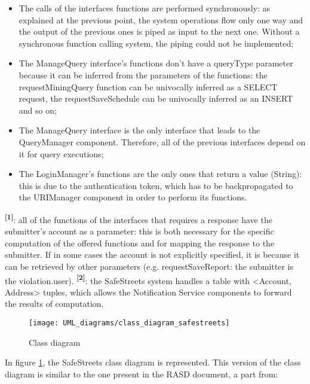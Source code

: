 \begin{itemize}
    \item The calls of the interfaces functions are performed synchronously: as explained at the previous point, the system operations flow only one way and the output of the previous ones is piped as input to the next one. Without a synchronous function calling system, the piping could not be implemented;
    \item The ManageQuery interface's functions don't have a queryType parameter because it can be inferred from the parameters of the functions: the requestMiningQuery function can be univocally inferred as a SELECT request, the requestSaveSchedule can be univocally inferred as an INSERT and so on;
    \item The ManageQuery interface is the only interface that leads to the QueryManager component. Therefore, all of the previous interfaces depend on it for query executions;
    \item The LoginManager's functions are the only ones that return a value (String): this is due to the authentication token, which has to be backpropagated to the URIManager component in order to perform its functions.
\end{itemize}
\textbf{\textsuperscript{[1]}}: all of the functions of the interfaces that requires a response have the submitter's account as a parameter: this is both necessary for the specific computation of the offered functions and for mapping the response to the submitter. If in some cases the account is not explicitly specified, it is because it can be retrieved by other parameters (e.g. requestSaveReport: the submitter is the violation.user).\newline
\textbf{\textsuperscript{[2]}}: the SafeStreets system handles a table with <Account, Address> tuples, which allows the Notification Service components to forward the results of computation.
\begin{figure}[H]
    \centering
    \texttt{[image: UML\_diagrams/class\_diagram\_safestreets]}
    \caption{Class diagram}
    \label{fig:class_diagram}
\end{figure}
In figure \ref{fig:class_diagram}, the SafeStreets class diagram is represented. This version of the class diagram is similar to the one present in the RASD document, a part from:
